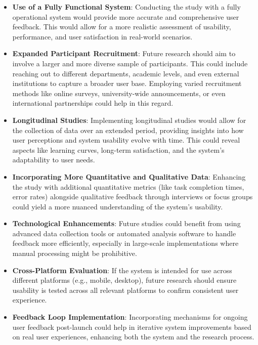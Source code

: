 \documentclass[conference]{IEEEtran}
\begin{document}
    \begin{itemize}
        \item \textbf{Use of a Fully Functional System}: Conducting the study with a fully operational system would provide more accurate and comprehensive user feedback. This would allow for a more realistic assessment of usability, performance, and user satisfaction in real-world scenarios.
    
        \item \textbf{Expanded Participant Recruitment}: Future research should aim to involve a larger and more diverse sample of participants. This could include reaching out to different departments, academic levels, and even external institutions to capture a broader user base. Employing varied recruitment methods like online surveys, university-wide announcements, or even international partnerships could help in this regard.
    
        \item \textbf{Longitudinal Studies}: Implementing longitudinal studies would allow for the collection of data over an extended period, providing insights into how user perceptions and system usability evolve with time. This could reveal aspects like learning curves, long-term satisfaction, and the system's adaptability to user needs.
    
        \item \textbf{Incorporating More Quantitative and Qualitative Data}: Enhancing the study with additional quantitative metrics (like task completion times, error rates) alongside qualitative feedback through interviews or focus groups could yield a more nuanced understanding of the system's usability. 
    
        \item \textbf{Technological Enhancements}: Future studies could benefit from using advanced data collection tools or automated analysis software to handle feedback more efficiently, especially in large-scale implementations where manual processing might be prohibitive.
    
        \item \textbf{Cross-Platform Evaluation}: If the system is intended for use across different platforms (e.g., mobile, desktop), future research should ensure usability is tested across all relevant platforms to confirm consistent user experience.
    
        \item \textbf{Feedback Loop Implementation}: Incorporating mechanisms for ongoing user feedback post-launch could help in iterative system improvements based on real user experiences, enhancing both the system and the research process.
    \end{itemize}
\end{document}
